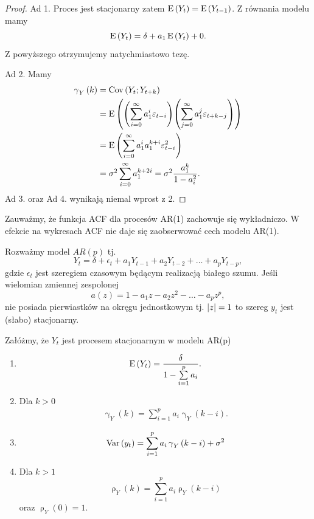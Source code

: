 \documentclass[10pt,a4paper]{book}
\newcommand{\tsAutoCovariance}[3][\gamma]{\operatorname{#1}_{#2} \left({#3}\right)}
\newcommand{\tsAutoCorellation}[3][\rho]{\operatorname{#1}_{#2} \left({#3}\right)}
\begin{document}
\begin{proof}
Ad 1. Proces jest stacjonarny zatem $\operatorname{E} \left({Y_t} \right) = \operatorname{E} \left({Y_{t-1}} \right)$. Z równania modelu mamy
$$
\operatorname{E} \left({Y_t} \right) = \delta + a_1 \operatorname{E} \left({Y_t} \right) + 0.
$$
Z powyższego otrzymujemy natychmiastowo tezę.

Ad 2. Mamy
\begin{align*}
\tsAutoCovariance{Y}{k} &= \Covariance{Y_t}{Y_{t+k}} \\
&= \Ex{ \bracket{\sum_{i=0}^{\infty} a_1^i \epsilon_{t-i}} \bracket{\sum_{j=0}^{\infty} a_1^j \epsilon_{t+k-j}} } 
\\
&= \Ex{ \sum_{i=0}^{\infty} a_1^i a_1^{k+i} \epsilon_{t-i}^2} \\
&= \sigma^2 \sum_{i=0}^{\infty} a_1^{k+2i} = \sigma^2 \frac{a_1^k}{1 - a_i^2}.
\end{align*} 
Ad 3. oraz Ad 4. wynikają niemal wprost z 2.
\end{proof}

\begin{remark}
Zauważmy, że funkcja ACF dla procesów AR(1) zachowuje się wykładniczo. W efekcie na wykresach ACF nie daje się zaobserwować cech modelu AR(1).
\end{remark}
\begin{theorem}
Rozważmy model $AR(p)$ tj. 
$$
Y_t = \delta + \epsilon_t + a_1 Y_{t-1} + a_2 Y_{t-2} + \ldots + a_p Y_{t-p} ,
$$
gdzie $\epsilon_t $ jest szeregiem czasowym będącym realizacją białego szumu. Jeśli wielomian zmiennej zespolonej
$$
a(z) = 1 - a_1 z - a_2 z^2 - \ldots - a_p z^p,
$$
nie posiada pierwiastków na okręgu jednostkowym tj. ${\left| {z} \right|} =1$ to szereg $y_t$ jest (słabo) stacjonarny.

\end{theorem}

\begin{proposition}[Własności AR(p)]
Załóżmy, że $Y_t$ jest procesem stacjonarnym w modelu AR(p)
\begin{enumerate}
\item 
$$
\Ex{Y_t} = \frac{\delta}{1	- \sum_{i=1}^{p} a_i}.
$$
\item Dla $k > 0$
\begin{align*}
\tsAutoCovariance{Y}{k} = \sum_{i=1}^{p} a_i \tsAutoCovariance{Y}{k-i}.
\end{align*}
\item 
$$
\Variance{y_t} = \sum_{i=1}^{p} a_i \tsAutoCovariance{Y}{k-i} + \sigma^2
$$
\item Dla $k>1$
$$
\tsAutoCorellation{Y}{k} = \sum_{i=1}^{p} a_i \tsAutoCorellation{Y}{k-i}
$$ 
oraz $\tsAutoCorellation{Y}{0} = 1$.
\end{enumerate}
\end{proposition}
\end{document}
